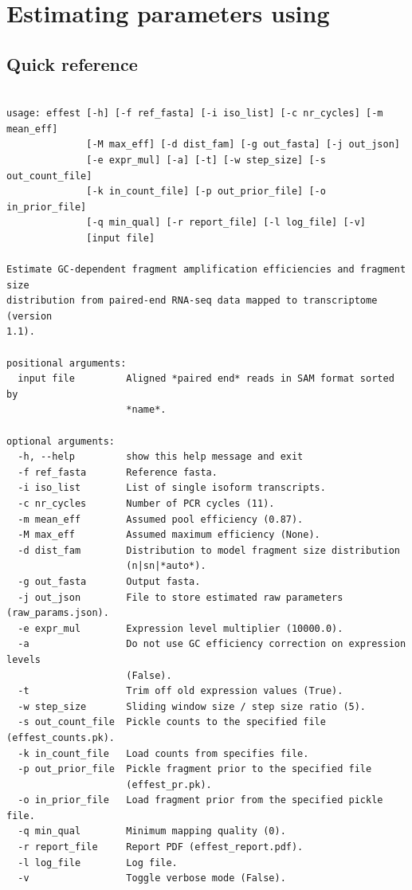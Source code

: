 \section{Estimating parameters using \effest}

\subsection{Quick reference}
\label{ss:qeffest}

\begin{verbatim}

usage: effest [-h] [-f ref_fasta] [-i iso_list] [-c nr_cycles] [-m mean_eff]
              [-M max_eff] [-d dist_fam] [-g out_fasta] [-j out_json]
              [-e expr_mul] [-a] [-t] [-w step_size] [-s out_count_file]
              [-k in_count_file] [-p out_prior_file] [-o in_prior_file]
              [-q min_qual] [-r report_file] [-l log_file] [-v]
              [input file]

Estimate GC-dependent fragment amplification efficiencies and fragment size
distribution from paired-end RNA-seq data mapped to transcriptome (version
1.1).

positional arguments:
  input file         Aligned *paired end* reads in SAM format sorted by
                     *name*.

optional arguments:
  -h, --help         show this help message and exit
  -f ref_fasta       Reference fasta.
  -i iso_list        List of single isoform transcripts.
  -c nr_cycles       Number of PCR cycles (11).
  -m mean_eff        Assumed pool efficiency (0.87).
  -M max_eff         Assumed maximum efficiency (None).
  -d dist_fam        Distribution to model fragment size distribution
                     (n|sn|*auto*).
  -g out_fasta       Output fasta.
  -j out_json        File to store estimated raw parameters (raw_params.json).
  -e expr_mul        Expression level multiplier (10000.0).
  -a                 Do not use GC efficiency correction on expression levels
                     (False).
  -t                 Trim off old expression values (True).
  -w step_size       Sliding window size / step size ratio (5).
  -s out_count_file  Pickle counts to the specified file (effest_counts.pk).
  -k in_count_file   Load counts from specifies file.
  -p out_prior_file  Pickle fragment prior to the specified file
                     (effest_pr.pk).
  -o in_prior_file   Load fragment prior from the specified pickle file.
  -q min_qual        Minimum mapping quality (0).
  -r report_file     Report PDF (effest_report.pdf).
  -l log_file        Log file.
  -v                 Toggle verbose mode (False).

\end{verbatim}

